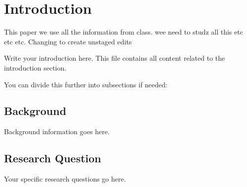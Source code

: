 \section{Introduction}
\label{sec:introduction}

This paper we use all the information from class. 
wee need to studz all this etc etc etc. Changing to create unstaged edits

Write your introduction here. This file contains all content related to the introduction section.

You can divide this further into subsections if needed:

\subsection{Background}
Background information goes here.

\subsection{Research Question}
Your specific research questions go here.